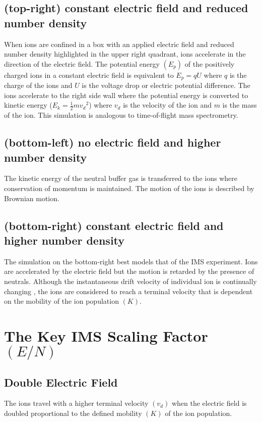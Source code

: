\documentclass[10pt,a4paper,final]{article}
\begin{document}
\subsection{(top-right) constant electric field and reduced number density}
When ions are confined in a box with an applied electric field and reduced number density highlighted in the upper right quadrant, ions accelerate in the direction of the electric field. The potential energy $(E_{p})$ of the positively charged ions in a constant electric field is equivalent to $E_{p}=qU$ where $q$ is the charge of the ions and $U$ is the voltage drop or electric potential difference. The ions accelerate to the right side wall where the potential energy is converted to kinetic energy ($E_k=\frac{1}{2}m{v_d}^2$) where $v_d$ is the velocity of the ion and $m$ is the mass of the ion.
This simulation is analogous to time-of-flight mass spectrometry.


\subsection{(bottom-left) no electric field and higher number density}
The kinetic energy of the neutral buffer gas is transferred to the ions where conservation of momentum is maintained. The motion of the ions is described by Brownian motion.

\subsection{(bottom-right) constant electric field and higher number density}
The simulation on the bottom-right best models that of the IMS experiment. Ions are accelerated by the electric field but the motion is retarded by the presence of neutrals.  Although the instantaneous drift velocity of individual ion is continually changing , the ions are considered to reach a terminal velocity that is dependent on the mobility of the ion population $(K)$.




\section{The Key IMS Scaling Factor $(E/N)$}

\subsection{Double Electric Field}
The ions travel with a higher terminal velocity $(v_d)$ when the electric field is doubled proportional to the defined mobility $(K)$ of the ion population.
\end{document}
